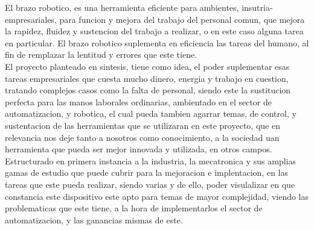 \documentclass[14pt,a4paper]{article}
\begin{document}
El brazo robotico, es una herramienta eficiente para ambientes, insutria-empresariales, para funcion y mejora del trabajo del personal comun, que mejora la rapidez, fluidez y sustencion del trabajo a realizar, o en este caso alguna tarea en particular. El brazo robotico suplementa en eficiencia las tareas del humano, al fin de remplazar la lentitud y errores que este tiene.\\
El proyecto planteado en sintesis, tiene como idea, el  poder suplementar esas tareas empresariales que cuesta mucho dinero, energia y trabajo en cuestion, tratando complejos casos como la falta de personal, siendo este la sustitucion perfecta para las manos laborales ordinarias, ambientado en el sector de automatizacion, y robotica, el cual pueda tambien agarrar temas, de control, y sustentacion de las herramientas que se utilizaran en este proyecto, que en relevancia nos deje tanto a nosotros como conocimiento, a la sociedad uan herramienta que pueda ser mejor innovada y utilizada, en otros campos.\\
Estructurado en primera instancia a la industria, la mecatronica y sus amplias gamas de estudio que puede cubrir para la mejoracion e implentacion, en las tareas que este pueda realizar, siendo varias y de ello, poder visulalizar en que constancia este dispositivo este apto para temas de mayor complejidad, viendo las problematicas que este tiene, a la  hora de implementarlos el sector de automatizacion, y las ganancias mismas de este.
\end{document}
